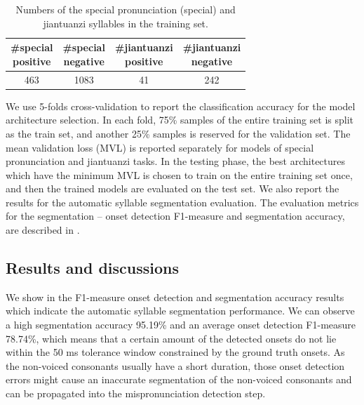 \begin{table}[ht!]
\centering
\caption{Numbers of the special pronunciation (special) and jiantuanzi syllables in the training set.}
\label{tab:ch6:num_syllables_training_set}
\begin{tabular}{cccc}
\toprule
\makecell{\#special\\positive} & \makecell{\#special\\negative} & \makecell{\#jiantuanzi\\positive} & \makecell{\#jiantuanzi\\negative} \\
\midrule
463 & 1083 & 41 & 242 \\
\bottomrule
\end{tabular}
\end{table}

We use 5-folds cross-validation to report the classification accuracy for the model architecture selection. In each fold, 75\% samples of the entire training set is split as the train set, and another 25\% samples is reserved for the validation set. The mean validation loss (MVL) is reported separately for models of special pronunciation and \gls{jiantuanzi} tasks. In the testing phase, the best architectures which have the minimum MVL is chosen to train on the entire training set once, and then the trained models are evaluated on the test set. We also report the results for the automatic syllable segmentation evaluation. The evaluation metrics for the segmentation -- onset detection F1-measure and segmentation accuracy, are described in . 

\subsection{Results and discussions}

We show in  the F1-measure onset detection and segmentation accuracy results which indicate the automatic syllable segmentation performance. We can observe a high segmentation accuracy 95.19\% and an average onset detection F1-measure 78.74\%, which means that a certain amount of the detected onsets do not lie within the 50 ms tolerance window constrained by the ground truth onsets. As the non-voiced consonants usually have a short duration, those onset detection errors might cause an inaccurate segmentation of the non-voiced consonants and can be propagated into the mispronunciation detection step. 

